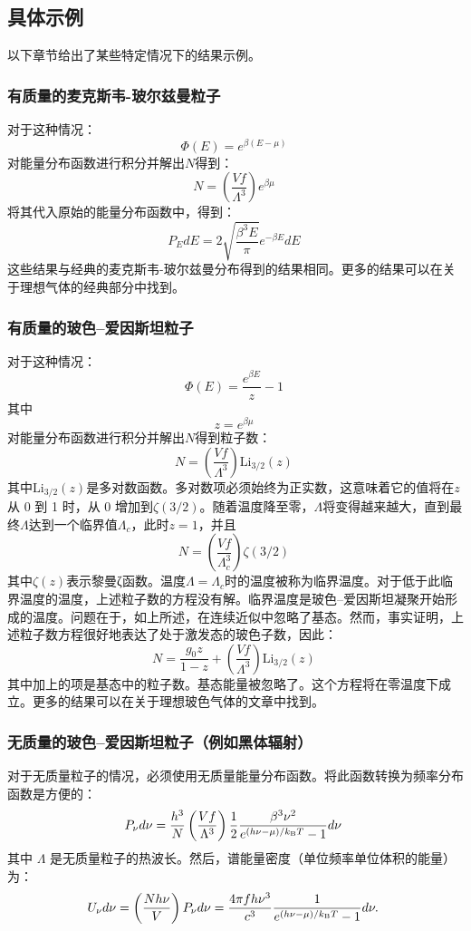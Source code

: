 \subsection{具体示例}  
以下章节给出了某些特定情况下的结果示例。
\subsubsection{有质量的麦克斯韦-玻尔兹曼粒子}  
对于这种情况：
\[
\Phi(E) = e^{\beta (E - \mu)}~
\]
对能量分布函数进行积分并解出\( N \)得到：
\[
N = \left( \frac{Vf}{\Lambda^3} \right) e^{\beta \mu}~
\]
将其代入原始的能量分布函数中，得到：
\[
P_E dE = 2 \sqrt{\frac{\beta^3 E}{\pi}} e^{-\beta E} dE~
\]
这些结果与经典的麦克斯韦-玻尔兹曼分布得到的结果相同。更多的结果可以在关于理想气体的经典部分中找到。
\subsubsection{有质量的玻色–爱因斯坦粒子}  
对于这种情况：
\[
\Phi(E) = \frac{e^{\beta E}}{z} - 1~
\]
其中
\[
z = e^{\beta \mu}~
\]
对能量分布函数进行积分并解出\( N \)得到粒子数：
\[
N = \left( \frac{Vf}{\Lambda^3} \right) \text{Li}_{3/2}(z)~
\]
其中\( \text{Li}_{3/2}(z) \)是多对数函数。多对数项必须始终为正实数，这意味着它的值将在\( z \)从 0 到 1 时，从 0 增加到\( \zeta(3/2) \)。随着温度降至零，\( \Lambda \)将变得越来越大，直到最终\( \Lambda \)达到一个临界值\( \Lambda_c \)，此时\( z = 1 \)，并且
\[
N = \left( \frac{Vf}{\Lambda_c^3} \right) \zeta(3/2)~
\]
其中\( \zeta(z) \)表示黎曼ζ函数。温度\( \Lambda = \Lambda_c \)时的温度被称为临界温度。对于低于此临界温度的温度，上述粒子数的方程没有解。临界温度是玻色–爱因斯坦凝聚开始形成的温度。问题在于，如上所述，在连续近似中忽略了基态。然而，事实证明，上述粒子数方程很好地表达了处于激发态的玻色子数，因此：
\[
N = \frac{g_0 z}{1 - z} + \left( \frac{Vf}{\Lambda^3} \right) \text{Li}_{3/2}(z)~
\]
其中加上的项是基态中的粒子数。基态能量被忽略了。这个方程将在零温度下成立。更多的结果可以在关于理想玻色气体的文章中找到。
\subsubsection{无质量的玻色–爱因斯坦粒子（例如黑体辐射）}  
对于无质量粒子的情况，必须使用无质量能量分布函数。将此函数转换为频率分布函数是方便的：
\[
P_{\nu} d\nu = \frac{h^3}{N} \left( \frac{Vf}{\Lambda^3} \right) \frac{1}{2} \frac{\beta^3 \nu^2}{e^{(h\nu - \mu) / k_{\rm B} T} - 1} d\nu~
\]
其中 \( \Lambda \) 是无质量粒子的热波长。然后，谱能量密度（单位频率单位体积的能量）为：
\[
U_{\nu} d\nu = \left( \frac{N h \nu}{V} \right) P_{\nu} d\nu = \frac{4 \pi f h \nu^3}{c^3} \frac{1}{e^{(h\nu - \mu) / k_{\rm B} T} - 1} d\nu.~
\]